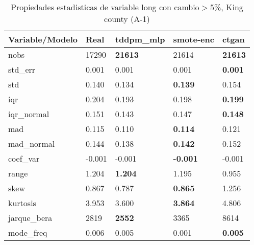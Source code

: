 \begin{table}[H]
\centering
\fontsize{8}{14}\selectfont
\caption{Propiedades estadisticas de variable long con cambio\ensuremath{>}5\%, King county (A-1)}
\label{table-stats-king county-a-1-long-short}
\begin{tabular}{|l|m{10em}|m{10em}|m{10em}|m{10em}|}
\hline
 \rowcolor[gray]{0.8}
Variable/Modelo & Real & tddpm\_mlp & smote-enc & ctgan \\
\hline nobs & 17290 & \bfseries 21613 & \cellcolor[rgb]{0.9, 0.54, 0.52} 21614 & \bfseries 21613 \\
\hline std\_err & 0.001 & \cellcolor[rgb]{0.9, 0.54, 0.52} 0.001 & 0.001 & \bfseries 0.001 \\
\hline std & 0.140 & 0.134 & \bfseries 0.139 & \cellcolor[rgb]{0.9, 0.54, 0.52} 0.154 \\
\hline iqr & 0.204 & \cellcolor[rgb]{0.9, 0.54, 0.52} 0.193 & 0.198 & \bfseries 0.199 \\
\hline iqr\_normal & 0.151 & \cellcolor[rgb]{0.9, 0.54, 0.52} 0.143 & 0.147 & \bfseries 0.148 \\
\hline mad & 0.115 & 0.110 & \bfseries 0.114 & \cellcolor[rgb]{0.9, 0.54, 0.52} 0.121 \\
\hline mad\_normal & 0.144 & 0.138 & \bfseries 0.142 & \cellcolor[rgb]{0.9, 0.54, 0.52} 0.152 \\
\hline coef\_var & -0.001 & -0.001 & \bfseries -0.001 & \cellcolor[rgb]{0.9, 0.54, 0.52} -0.001 \\
\hline range & 1.204 & \bfseries 1.204 & 1.195 & \cellcolor[rgb]{0.9, 0.54, 0.52} 0.955 \\
\hline skew & 0.867 & 0.787 & \bfseries 0.865 & \cellcolor[rgb]{0.9, 0.54, 0.52} 1.256 \\
\hline kurtosis & 3.953 & 3.600 & \bfseries 3.864 & \cellcolor[rgb]{0.9, 0.54, 0.52} 4.806 \\
\hline jarque\_bera & 2819 & \bfseries 2552 & 3365 & \cellcolor[rgb]{0.9, 0.54, 0.52} 8614 \\
\hline mode\_freq & 0.006 & 0.005 & \cellcolor[rgb]{0.9, 0.54, 0.52} 0.001 & \bfseries 0.005 \\
\hline
\end{tabular}
\end{table}
